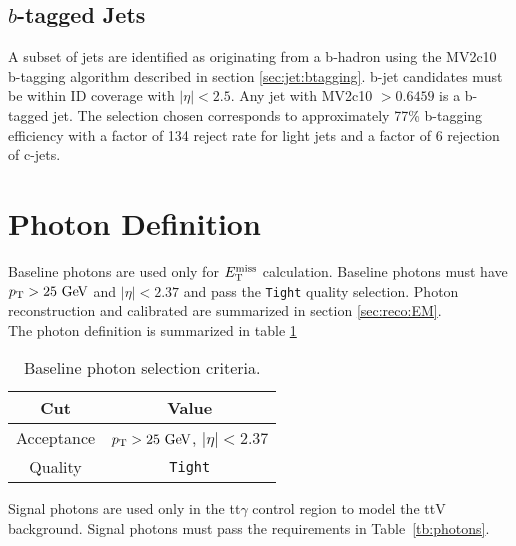 \subsection{\boldmath $b$-tagged Jets}

\indent A subset of jets are identified as originating from a b-hadron using the MV2c10 b-tagging algorithm described in section \ref{sec:jet:btagging}.  b-jet candidates must be within ID coverage with $|\eta|<2.5$.  Any jet with MV2c10 $ > 0.6459$ is a b-tagged jet.  The selection chosen corresponds to approximately 77\% b-tagging efficiency with a factor of 134 reject rate for light jets and a factor of 6 rejection of c-jets.\\

\section{Photon Definition}
\label{sec:PhoDef}

\indent Baseline photons are used only for $E_{\mathrm{T}}^{\mathrm{miss}}$ calculation.  Baseline photons must have $\pt > 25 \gev$ and $|\eta| < 2.37$ and pass the {\tt Tight} quality selection.  Photon reconstruction and calibrated are summarized in section \ref{sec:reco:EM}. \\

\indent The photon definition is summarized in table \ref{tb:photons:baseline} \\

\begin{table}[htp]
  \caption{Baseline photon selection criteria.} 
  \begin{center}
    \begin{tabular}{c|c} \hline \hline
      Cut & Value \\ \hline \hline
      Acceptance & $\pT > 25 \gev$, $|\eta| < 2.37$ \\ \hline
      Quality & {\tt Tight} \\ \hline
      \hline
    \end{tabular}
  \end{center}
  \label{tb:photons:baseline}
\end{table}%

\indent Signal photons are used only in the tt$\gamma$ control region to model the ttV background.  Signal photons must pass the requirements in Table~\ref{tb:photons}.  \\%

